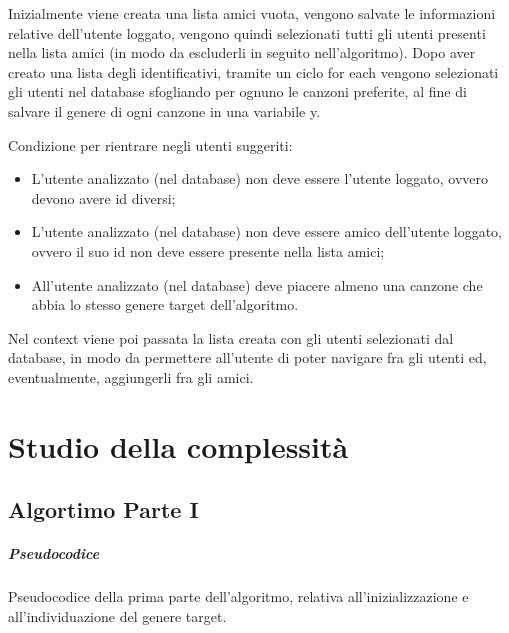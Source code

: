 Inizialmente viene creata una lista amici vuota, vengono salvate le informazioni relative dell'utente loggato, vengono quindi 
selezionati tutti gli utenti presenti nella lista amici (in modo da escluderli in seguito nell'algoritmo).
Dopo aver creato una lista degli identificativi, tramite un ciclo for each vengono selezionati gli utenti nel database 
sfogliando per ognuno le canzoni preferite, al fine di salvare il genere di ogni canzone in una variabile y.

Condizione per rientrare negli utenti suggeriti:
\begin{itemize}
    \item L'utente analizzato (nel database) non deve essere l'utente loggato, ovvero devono avere id diversi;
    \item L'utente analizzato (nel database) non deve essere amico dell'utente loggato, ovvero il suo id non deve essere presente 
    nella lista amici;
    \item All'utente analizzato (nel database) deve piacere almeno una canzone che abbia lo stesso genere target dell'algoritmo.

\end{itemize}

Nel context viene poi passata la lista creata con gli utenti selezionati dal database, in modo da permettere all'utente di poter
navigare fra gli utenti ed, eventualmente, aggiungerli fra gli amici. 




\newpage

\section{Studio della complessità}

\subsection{Algortimo Parte I}
\vspace{0.5cm}
\subparagraph{Pseudocodice}
Pseudocodice della prima parte dell'algoritmo, relativa all'inizializzazione 
e all'individuazione del genere target. 


